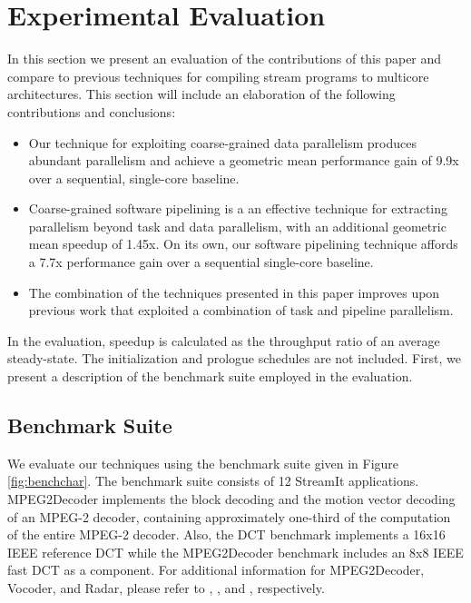 \section{Experimental Evaluation}

In this section we present an evaluation of the contributions of this
paper and compare to previous techniques for compiling stream programs
to multicore architectures.  This section will include an elaboration
of the following contributions and conclusions:

\begin{itemize}
\item Our technique for exploiting coarse-grained data parallelism
produces abundant parallelism and achieve a geometric mean performance
gain of 9.9x over a sequential, single-core baseline.
\item Coarse-grained software pipelining is a
an effective technique for extracting parallelism beyond task and data
parallelism, with an additional geometric mean speedup of 1.45x. On
its own, our software pipelining technique affords a 7.7x performance
gain over a sequential single-core baseline.
\item The combination of the techniques presented in this paper
improves upon previous work that exploited a combination of task and
pipeline parallelism.
\end{itemize}

In the evaluation, speedup is calculated as the throughput ratio of an
average steady-state.  The initialization and prologue schedules are
not included.  First, we present a description of the benchmark suite
employed in the evaluation.

\begin{figure*}[t]
\centering
{}
\caption{Benchmark characteristics
\protect\label{fig:benchchar}}
\end{figure*}

\subsection{Benchmark Suite}
We evaluate our techniques using the benchmark suite given in Figure
\ref{fig:benchchar}.   The benchmark suite consists of 12 StreamIt
applications. MPEG2Decoder implements the block decoding and the
motion vector decoding of an MPEG-2 decoder, containing approximately
one-third of the computation of the entire MPEG-2 decoder.  Also, the
DCT benchmark implements a 16x16 IEEE reference DCT while the
MPEG2Decoder benchmark includes an 8x8 IEEE fast DCT as a component.
For additional information for MPEG2Decoder, Vocoder, and Radar,
please refer to \cite{ipdps2006},
\cite{seneff80}, and \cite{pca}, respectively. 

